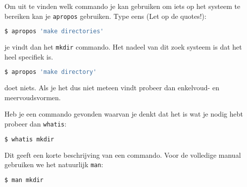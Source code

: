 
Om uit te vinden welk commando je kan gebruiken om iets op het systeem te bereiken kan je \texttt{apropos} gebruiken. Type eens (Let op de quotes!):
\begin{lstlisting}[language=bash]
$ apropos 'make directories'
\end{lstlisting}
je vindt dan het \texttt{mkdir} commando. Het nadeel van dit zoek systeem is dat het heel specifiek is.

\begin{lstlisting}[language=bash]
$ apropos 'make directory'
\end{lstlisting}
doet niets. Als je het dus niet meteen vindt probeer dan enkelvoud- en meervoudsvormen.

Heb je een commando gevonden waarvan je denkt dat het is wat je nodig hebt probeer dan \texttt{whatis}:

\begin{lstlisting}[language=bash]
$ whatis mkdir
\end{lstlisting}

Dit geeft een korte beschrijving van een commando. Voor de volledige manual gebruiken we het natuurlijk \texttt{man}:
\begin{lstlisting}[language=bash]
$ man mkdir
\end{lstlisting}

